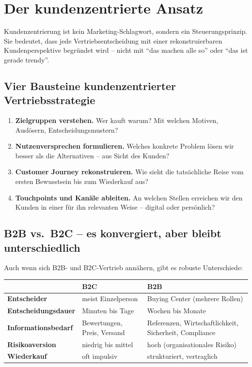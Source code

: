 \documentclass[11pt,a4paper,oneside]{article}
\begin{document}
\section{Der kundenzentrierte Ansatz}

Kundenzentrierung ist kein Marketing-Schlagwort, sondern ein Steuerungsprinzip. Sie bedeutet, dass jede Vertriebsentscheidung mit einer rekonstruierbaren Kundenperspektive begründet wird -- nicht mit ``das machen alle so'' oder ``das ist gerade trendy''.

\subsection{Vier Bausteine kundenzentrierter Vertriebsstrategie}

\begin{enumerate}
  \item \textbf{Zielgruppen verstehen.} Wer kauft warum? Mit welchen Motiven, Auslösern, Entscheidungsmustern?
  \item \textbf{Nutzenversprechen formulieren.} Welches konkrete Problem lösen wir besser als die Alternativen -- aus Sicht des Kunden?
  \item \textbf{Customer Journey rekonstruieren.} Wie sieht die tatsächliche Reise vom ersten Bewusstsein bis zum Wiederkauf aus?
  \item \textbf{Touchpoints und Kanäle ableiten.} An welchen Stellen erreichen wir den Kunden in einer für ihn relevanten Weise -- digital oder persönlich?
\end{enumerate}

\subsection{B2B vs.\ B2C -- es konvergiert, aber bleibt unterschiedlich}

Auch wenn sich B2B- und B2C-Vertrieb annähern, gibt es robuste Unterschiede:

\begin{tabularx}{\linewidth}{@{}lXX@{}}
\toprule
& \textbf{B2C} & \textbf{B2B} \\
\midrule
\textbf{Entscheider} & meist Einzelperson & Buying Center (mehrere Rollen) \\
\textbf{Entscheidungsdauer} & Minuten bis Tage & Wochen bis Monate \\
\textbf{Informationsbedarf} & Bewertungen, Preis, Versand & Referenzen, Wirtschaftlichkeit, Sicherheit, Compliance \\
\textbf{Risikoaversion} & niedrig bis mittel & hoch (organisationales Risiko) \\
\textbf{Wiederkauf} & oft impulsiv & strukturiert, vertraglich \\
\bottomrule
\end{tabularx}
\end{document}
